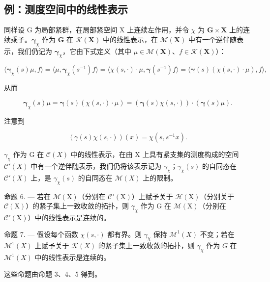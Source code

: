 \subsection{例：测度空间中的线性表示}

同样设 G 为局部紧群，在局部紧空间 X 上连续左作用，并令 \(\chi\) 为 \(\mathbf{G} \times \mathbf{X}\) 上的连续乘子。\(\boldsymbol{\gamma}_{\chi}\) 作为 \(\mathbf{G}\) 在 \(\mathcal{K}(\mathbf{X})\) 中的线性表示，在 \(\mathcal{M}(\mathbf{X})\) 中有一个逆伴随表示，我们仍记为 \(\boldsymbol{\gamma}_{\chi}\)，它由下式定义（其中 \(\mu \in \mathcal{M}(\mathbf{X})\)、\(f \in \mathcal{K}(\mathbf{X})\)）：

\[
\langle \boldsymbol {\gamma} _ {\chi} (s) \mu , f \rangle = \langle \mu , \boldsymbol {\gamma} _ {\chi} (s ^ {- 1}) f \rangle = \langle \chi (s, \cdot) \cdot \mu , \boldsymbol {\gamma} (s ^ {- 1}) f \rangle = \langle \boldsymbol {\gamma} (s) (\chi (s, \cdot) \cdot \mu), f \rangle ,
\]

从而

\[
\boldsymbol {\gamma} _ {\chi} (s) \mu = \boldsymbol {\gamma} (s) (\chi (s, \cdot) \cdot \mu) = (\boldsymbol {\gamma} (s) \chi (s, \cdot)) \cdot (\boldsymbol {\gamma} (s) \mu).
\]

注意到

\[
\left(\gamma (s) \chi (s, \cdot)\right) (x) = \chi (s, s ^ {- 1} x).
\]

\(\gamma_{\chi}\) 作为 G 在 \(\mathcal{C}(X)\) 中的线性表示，在由 X 上具有紧支集的测度构成的空间 \(\mathcal{C}'(X)\) 中有一个逆伴随表示，我们仍将该表示记为 \(\gamma_{\chi}\)；\(\gamma_{\chi}(s)\) 的自同态在 \(\mathcal{C}'(X)\) 上，是 \(\gamma_{\chi}(s)\) 的自同态在 \(\mathcal{M}(X)\) 上的限制。

命题 6. --- 若在 \(\mathcal{M}(\mathrm{X})\)（分别在 \(\mathcal{C}'(\mathrm{X})\)）上赋予关于 \(\mathcal{H}(\mathrm{X})\)（分别关于 \(\mathcal{C}(\mathrm{X})\)）的紧子集上一致收敛的拓扑，则 \(\gamma_{\chi}\) 作为 \(\mathrm{G}\) 在 \(\mathcal{M}(\mathrm{X})\)（分别在 \(\mathcal{C}'(\mathrm{X})\)）中的线性表示是连续的。

命题 7. --- 假设每个函数 \(\chi(s,\cdot)\) 都有界。则 \(\gamma_{\chi}\) 保持 \(\mathcal{M}^{1}(X)\) 不变；若在 \(\mathcal{M}^{1}(X)\) 上赋予关于 \(\overline{\mathcal{K}(X)}\) 的紧子集上一致收敛的拓扑，则 \(\gamma_{\chi}\) 作为 \(G\) 在 \(\mathcal{M}^{1}(X)\) 中的线性表示是连续的。

这些命题由命题 3、4、5 得到。

